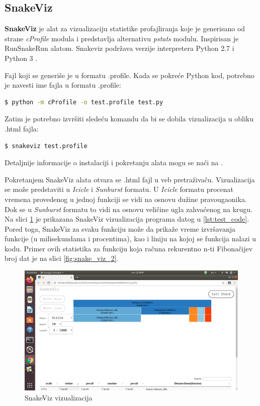 \documentclass[a4paper]{article}
\begin{document}
\subsection{SnakeViz} 
\label{profajler_2}
\textbf{SnakeViz} je alat za vizualizaciju statistike profajliranja koje je generisano od strane {\em cProfile} modula i predstavlja alternativu {\em pstats} modulu. Inspirisan je RunSnakeRun alatom. Snakeviz podržava verzije interpretera Python 2.7 i Python 3 \cite{SnakeViz1}. 
\par
Fajl koji se generiše je u formatu .profile. Kada se pokreće Python kod, potrebno je navesti ime fajla u formatu .profile:
\begin{lstlisting}[language=bash, belowskip=-\baselineskip]
  $ python -m cProfile -o test.profile test.py
\end{lstlisting}
Zatim je potrebno izvršiti sledeću komandu da bi se dobila vizualizacija u obliku .html fajla:
\begin{lstlisting}[language=bash, belowskip=-\baselineskip]
  $ snakeviz test.profile
\end{lstlisting}
Detaljnije informacije o instalaciji i pokretanju alata mogu se naći na \cite{SnakeViz1}.

Pokretanjem SnakeViz alata otvara se .html fajl u veb pretraživaču. Vizualizacija se može predstaviti u {\em Icicle} i {\em Sunburst} formatu. U {\em Icicle} formatu procenat vremena provedenog u jednoj funkciji se vidi na osnovu dužine pravougaonika. Dok se u {\em Sunburst} formatu to vidi na osnovu veličine ugla zahvaćenog na krugu. Na slici \ref{fig:snake_viz_1} je prikazana SnakeViz vizualizacija programa datog u \ref{lst:test_code}. Pored toga, SnakeViz za svaku funkciju može da prikaže vreme izvršavanja funkcije (u milisekundama i procentima), kao i liniju na kojoj se funkcija nalazi u kodu. Primer ovih statistika za funkciju koja računa rekurentno n-ti Fibonačijev broj dat je na slici \ref{fig:snake_viz_2}.
\begin{figure}[h!]
\begin{center}
\includegraphics[trim={10cm 15cm 5cm 6.5cm},clip,scale=0.35]{snakeviz1.png}
\end{center}
\caption{SnakeViz vizualizacija}
\label{fig:snake_viz_1}
\end{figure}
\end{document}
